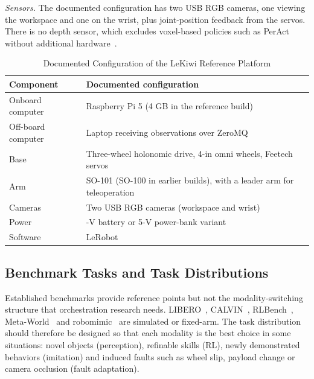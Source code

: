 \documentclass[journal]{IEEEtran}
\begin{document}
\textit{Sensors.} The documented configuration has two USB RGB cameras, one viewing the workspace and one on the wrist, plus joint-position feedback from the servos. There is no depth sensor, which excludes voxel-based policies such as PerAct without additional hardware~\cite{Shridhar2022}.

\begin{table}[!t]
\centering
\caption{Documented Configuration of the LeKiwi Reference Platform}\label{tab:hw}%
\footnotesize
\begin{tabular}{@{}>{\raggedright\arraybackslash}p{0.300\dimexpr\columnwidth-4\tabcolsep\relax}>{\raggedright\arraybackslash}p{0.700\dimexpr\columnwidth-4\tabcolsep\relax}@{}}
\toprule
\textbf{Component} & \textbf{Documented configuration} \\ \midrule
Onboard computer & Raspberry Pi 5 (4 GB in the reference build) \\
Off-board computer & Laptop receiving observations over ZeroMQ \\
Base & Three-wheel holonomic drive, 4-in omni wheels, Feetech servos \\
Arm & SO-101 (SO-100 in earlier builds), with a leader arm for teleoperation \\
Cameras & Two USB RGB cameras (workspace and wrist) \\
Power & 12-V battery or 5-V power-bank variant \\
Software & LeRobot~\cite{Cadene2024,Cadene2026} \\
\bottomrule
\end{tabular}
\end{table}


\subsection{Benchmark Tasks and Task Distributions}\label{sec:bench}
Established benchmarks provide reference points but not the modality-switching structure that orchestration research needs. LIBERO~\cite{Liu2023b}, CALVIN~\cite{Mees2022}, RLBench~\cite{James2020}, Meta-World~\cite{Yu2019} and robomimic~\cite{Mandlekar2021} are simulated or fixed-arm. The task distribution should therefore be designed so that each modality is the best choice in some situations: novel objects (perception), refinable skills (RL), newly demonstrated behaviors (imitation) and induced faults such as wheel slip, payload change or camera occlusion (fault adaptation).
\end{document}
